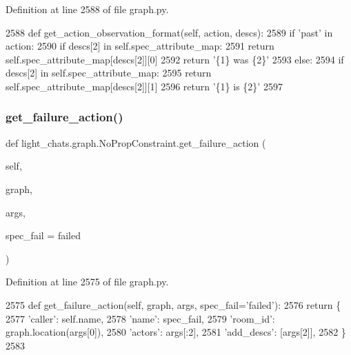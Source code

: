 Definition at line 2588 of file graph.\+py.


\begin{DoxyCode}
2588     \textcolor{keyword}{def }get\_action\_observation\_format(self, action, descs):
2589         \textcolor{keywordflow}{if} \textcolor{stringliteral}{'past'} \textcolor{keywordflow}{in} action:
2590             \textcolor{keywordflow}{if} descs[2] \textcolor{keywordflow}{in} self.spec\_attribute\_map:
2591                 \textcolor{keywordflow}{return} self.spec\_attribute\_map[descs[2]][0]
2592             \textcolor{keywordflow}{return} \textcolor{stringliteral}{'\{1\} was \{2\}'}
2593         \textcolor{keywordflow}{else}:
2594             \textcolor{keywordflow}{if} descs[2] \textcolor{keywordflow}{in} self.spec\_attribute\_map:
2595                 \textcolor{keywordflow}{return} self.spec\_attribute\_map[descs[2]][1]
2596             \textcolor{keywordflow}{return} \textcolor{stringliteral}{'\{1\} is \{2\}'}
2597 
\end{DoxyCode}
\mbox{\label{classlight__chats_1_1graph_1_1NoPropConstraint_ad9fd1275af02f384bd55ceaebc6ee59c}} 
\subsubsection{\texorpdfstring{get\+\_\+failure\+\_\+action()}{get\_failure\_action()}}
{\footnotesize\ttfamily def light\+\_\+chats.\+graph.\+No\+Prop\+Constraint.\+get\+\_\+failure\+\_\+action (\begin{DoxyParamCaption}\item[{}]{self,  }\item[{}]{graph,  }\item[{}]{args,  }\item[{}]{spec\+\_\+fail = {\ttfamily \textquotesingle{}failed\textquotesingle{}} }\end{DoxyParamCaption})}



Definition at line 2575 of file graph.\+py.


\begin{DoxyCode}
2575     \textcolor{keyword}{def }get\_failure\_action(self, graph, args, spec\_fail='failed'):
2576         \textcolor{keywordflow}{return} \{
2577             \textcolor{stringliteral}{'caller'}: self.name,
2578             \textcolor{stringliteral}{'name'}: spec\_fail,
2579             \textcolor{stringliteral}{'room\_id'}: graph.location(args[0]),
2580             \textcolor{stringliteral}{'actors'}: args[:2],
2581             \textcolor{stringliteral}{'add\_descs'}: [args[2]],
2582         \}
2583 
\end{DoxyCode}


